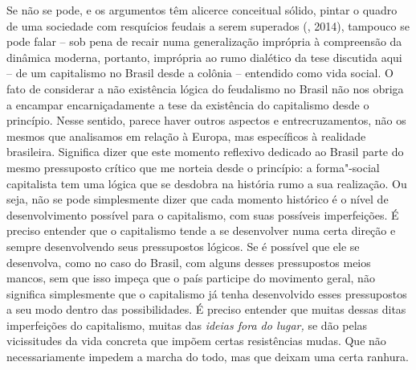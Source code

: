 Se não se
pode, e os argumentos têm alicerce conceitual sólido, pintar o quadro de
uma sociedade com resquícios feudais a serem superados (, 2014),
tampouco se pode falar -- sob pena de recair numa generalização
imprópria à compreensão da dinâmica moderna, portanto, imprópria ao rumo
dialético da tese discutida aqui -- de um capitalismo no Brasil desde a colônia
-- entendido como vida social. O fato de considerar a não
existência lógica do feudalismo no Brasil não nos obriga a encampar
encarniçadamente a tese da existência do capitalismo desde o princípio.
Nesse sentido, parece haver outros aspectos e entrecruzamentos, não os
mesmos que analisamos em relação à Europa, mas específicos à realidade
brasileira. Significa dizer que este momento reflexivo dedicado ao Brasil parte do
mesmo pressuposto crítico que me norteia desde o princípio: a
forma"-social capitalista tem uma lógica que se desdobra na história rumo
a sua realização. Ou seja, não se pode simplesmente dizer que cada
momento histórico é o nível de desenvolvimento possível para o
capitalismo, com suas possíveis imperfeições. É preciso entender que o
capitalismo tende a se desenvolver numa certa direção e sempre
desenvolvendo seus pressupostos lógicos. Se é possível que ele se
desenvolva, como no caso do Brasil, com alguns desses pressupostos
meios mancos, sem que isso impeça que o país participe do movimento
geral, não significa simplesmente que o capitalismo já tenha
desenvolvido esses pressupostos a seu modo dentro das possibilidades. É
preciso entender que muitas dessas ditas imperfeições do capitalismo,
muitas das \emph{ideias fora do lugar,} se dão pelas vicissitudes da
vida concreta que impõem certas resistências mudas. Que não
necessariamente impedem a marcha do todo, mas que deixam uma certa
ranhura.

